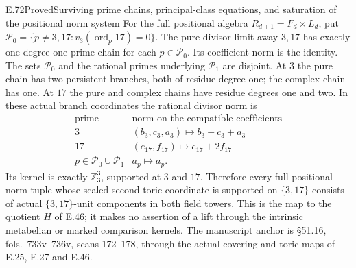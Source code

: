 \begin{statement}{E.72}{Proved}{Surviving prime chains, principal-class equations, and saturation of the positional norm system}
For the full positional algebra
$R_{d+1}=F_d\times L_d$, put
$\mathcal P_0=\{p\ne3,17:v_3(\operatorname{ord}_p17)=0\}$.
The pure divisor limit away $3,17$ has exactly one degree-one
prime chain for each $p\in\mathcal P_0$. Its coefficient norm
is the identity. The sets $\mathcal P_0$ and the rational
primes underlying $\mathcal P_1$ are disjoint. At $3$ the
pure chain has two persistent branches, both of residue
degree one; the complex chain has one. At $17$ the pure
and complex chains have residue degrees one and two.
In these actual branch coordinates the rational divisor norm is
\[
 \begin{array}{c|c}
 \text{prime}&\text{norm on the compatible coefficients}\\ \hline
 3&(b_3,c_3,a_3)\longmapsto b_3+c_3+a_3\\
 17&(e_{17},f_{17})\longmapsto e_{17}+2f_{17}\\
 p\in\mathcal P_0\cup\mathcal P_1&a_p\longmapsto a_p .
 \end{array}
 \tag{E72.12}
\]
Its kernel is exactly $\mathbb Z_3^3$, supported at $3$ and $17$.
Therefore every full positional norm tuple whose scaled second
toric coordinate is supported on $\{3,17\}$ consists of actual
$\{3,17\}$-unit components in both field towers. This is the
map to the quotient $H$ of E.46; it makes no assertion of a
lift through the intrinsic metabelian or marked comparison kernels.
The manuscript anchor is \S51.16, fols.\ 733v--736v,
scans 172--178, through the actual covering and toric maps of
E.25, E.27 and E.46.
\end{statement}


